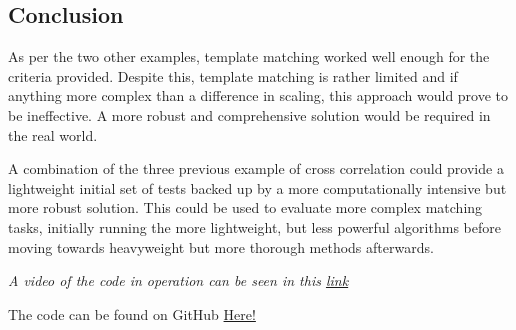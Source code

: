 \documentclass[conference]{IEEEtran}
\begin{document}
\subsection{Conclusion}

As per the two other examples, template matching worked well enough for the criteria provided. Despite this, template matching is rather limited and if anything more complex than a difference in scaling, this approach would prove to be ineffective. A more robust and comprehensive solution would be required in the real world.

A combination of the three previous example of cross correlation could provide a lightweight initial set of tests backed up by a more computationally intensive but more robust solution. This could be used to evaluate more complex matching tasks, initially running the more lightweight, but less powerful algorithms before moving towards heavyweight but more thorough methods afterwards. 

\textit{A video of the code in operation can be seen in this \href{https://github.com/LukeDWaller99/Aint308}{link}}





The code can be found on GitHub \href{https://github.com/LukeDWaller99/Aint308}{Here!} 

\onecolumn
\end{document}

